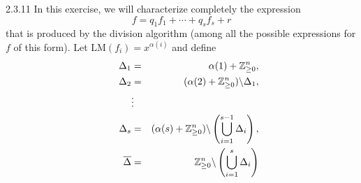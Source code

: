 \documentclass[12pt]{article}
\begin{document}
2.3.11
In this exercise, we will characterize completely the expression
$$f=q_1f_1 + \cdots + q_sf_s+r$$ that is produced by the division algorithm (among all the possible expressions for $f$ of this form). Let $\text{LM}(f_i)=x^{\alpha(i)}$ and define
\begin{align*}
    \Delta_1 &=& \alpha(1)+\mathbb{Z}^n_{\geq 0},\\
    \Delta_2 &=& (\alpha(2)+\mathbb{Z}^n_{\geq 0})\backslash \Delta_1,\\
     \hspace{1.cm} &\vdots&\\
    \Delta_s &=&(\alpha(s)+\mathbb{Z}^n_{\geq 0})\backslash \left(\bigcup^{s-1}_{i=1}\Delta_i\right),\\
    \overline{\Delta} &=& \mathbb{Z}^n_{\geq 0}\backslash \left(\bigcup^{s}_{i=1}\Delta_i\right)
\end{align*}
\end{document}

